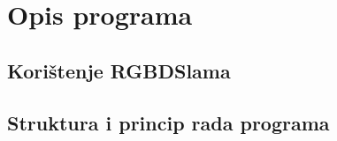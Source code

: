 \newpage

\section{Opis programa} %
\label{sec:Opis programa}

\subsection{Korištenje RGBDSlama} %
\label{sub:Korištenje RGBDSlama}

\subsection{Struktura i princip rada programa} %
\label{sub:Struktura i princip rada programa}


